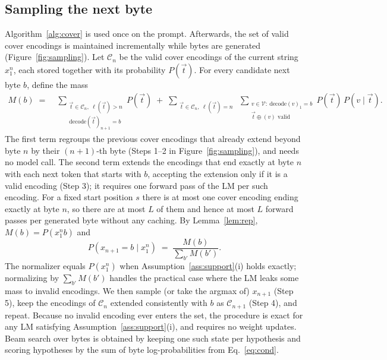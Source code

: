 \documentclass{article} %
\newcommand{\vocab}{\mathcal{V}}
\newcommand{\dec}{\mathrm{decode}}
\begin{document}
\subsection{Sampling the next byte}
\label{sec:sampling}
Algorithm~\ref{alg:cover} is used once on the prompt. Afterwards, the set of valid cover encodings is maintained incrementally while bytes are generated (Figure~\ref{fig:sampling}). Let $\mathcal C_n$ be the valid cover encodings of the current string $x_1^n$, each stored together with its probability $P(\vec t)$. For every candidate next byte $b$, define the mass
\begin{equation}
\begin{aligned}
M(b) \;=\;& \sum_{\substack{\vec t \in \mathcal C_n,\ \ell(\vec t) > n \\ \dec(\vec t)_{n+1} = b}} P(\vec t)
\;+\; \sum_{\substack{\vec t \in \mathcal C_n,\ \ell(\vec t) = n}} \ \sum_{\substack{v \in \vocab:\ \dec(v)_1 = b \\ \vec t \oplus (v) \text{ valid}}} P(\vec t)\,P(v \mid \vec t).
\end{aligned}
\label{eq:mass}
\end{equation}
The first term regroups the previous cover encodings that already extend beyond byte $n$ by their $(n{+}1)$-th byte (Steps 1--2 in Figure~\ref{fig:sampling}), and needs no model call. The second term extends the encodings that end exactly at byte $n$ with each next token that starts with $b$, accepting the extension only if it is a valid encoding (Step 3); it requires one forward pass of the LM per such encoding. For a fixed start position $s$ there is at most one cover encoding ending exactly at byte $n$, so there are at most $L$ of them and hence at most $L$ forward passes per generated byte without any caching. By Lemma~\ref{lem:rep}, $M(b) = P(x_1^{n} b)$ and
\begin{equation}
P(x_{n+1} = b \mid x_1^n) \;=\; \frac{M(b)}{\sum_{b'} M(b')}.
\label{eq:cond}
\end{equation}
The normalizer equals $P(x_1^n)$ when Assumption~\ref{ass:support}(i) holds exactly; normalizing by $\sum_{b'} M(b')$ handles the practical case where the LM leaks some mass to invalid encodings. We then sample (or take the argmax of) $x_{n+1}$ (Step 5), keep the encodings of $\mathcal C_n$ extended consistently with $b$ as $\mathcal C_{n+1}$ (Step 4), and repeat. Because no invalid encoding ever enters the set, the procedure is exact for any LM satisfying Assumption~\ref{ass:support}(i), and requires no weight updates. Beam search over bytes is obtained by keeping one such state per hypothesis and scoring hypotheses by the sum of byte log-probabilities from Eq.~\eqref{eq:cond}.
\end{document}

